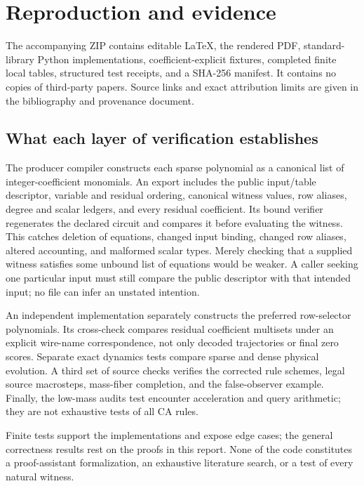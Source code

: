 \documentclass[11pt,letterpaper]{article}
\numberwithin{equation}{section}
\theoremstyle{definition}
\theoremstyle{remark}
\begin{document}
\section{Reproduction and evidence}\label{smc:sl:sec:reproduction}
The accompanying ZIP contains editable LaTeX, the rendered PDF, standard-library Python implementations, coefficient-explicit fixtures, completed finite local tables, structured test receipts, and a SHA-256 manifest. It contains no copies of third-party papers. Source links and exact attribution limits are given in the bibliography and provenance document.

\subsection{What each layer of verification establishes}
The producer compiler constructs each sparse polynomial as a canonical list of integer-coefficient monomials. An export includes the public input/table descriptor, variable and residual ordering, canonical witness values, row aliases, degree and scalar ledgers, and every residual coefficient. Its bound verifier regenerates the declared circuit and compares it before evaluating the witness. This catches deletion of equations, changed input binding, changed row aliases, altered accounting, and malformed scalar types. Merely checking that a supplied witness satisfies some unbound list of equations would be weaker. A caller seeking one particular input must still compare the public descriptor with that intended input; no file can infer an unstated intention.

An independent implementation separately constructs the preferred row-selector polynomials. Its cross-check compares residual coefficient multisets under an explicit wire-name correspondence, not only decoded trajectories or final zero scores. Separate exact dynamics tests compare sparse and dense physical evolution. A third set of source checks verifies the corrected rule schemes, legal source macrosteps, mass-fiber completion, and the false-observer example. Finally, the low-mass audits test encounter acceleration and query arithmetic; they are not exhaustive tests of all CA rules.

Finite tests support the implementations and expose edge cases; the general correctness results rest on the proofs in this report. None of the code constitutes a proof-assistant formalization, an exhaustive literature search, or a test of every natural witness.
\end{document}
